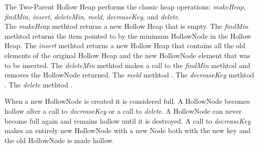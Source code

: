 \documentclass[letter,10pt]{article}
\begin{document}
\quad The Two-Parent Hollow Heap performs the classic heap operations: \textit{makeHeap}, \textit{findMin}, \textit{insert}, \textit{deleteMin}, \textit{meld}, \textit{decreaseKey}, and \textit{delete}.\\ The \textit{makeHeap} methtod returns a new Hollow Heap that is empty. The \textit{findMin} methtod returns the item pointed to by the minimum HollowNode in the Hollow Heap. The \textit{insert} methtod returns a new Hollow Heap that contains all the old elements of the original Hollow Heap and the new HollowNode element that was to be inserted. The \textit{deleteMin} methtod makes a call to the \textit{findMin} methtod and removes the HollowNode returned. The \textit{meld} methtod . The \textit{decreaseKey} methtod . The \textit{delete} methtod . 


When a new HollowNode is created it is considered full.  A HollowNode becomes hollow after a call to \textit{decreaseKey} or a call to \textit{delete}. A HollowNode can never become full again and remains hollow until it is destroyed.
A call to \textit{decreaseKey} makes an entirely new HollowNode with a new Node both with the new key and the old HollowNode is made hollow.  

\end{document}
